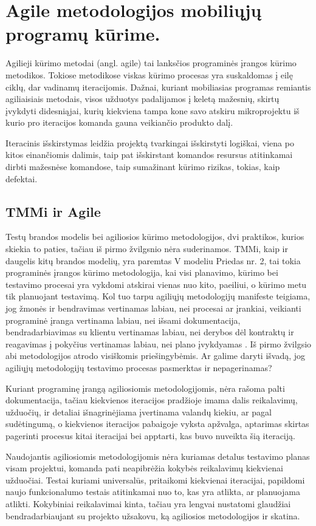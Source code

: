 \documentclass{VUMIFPSkursinis}
\begin{document}
\section{Agile metodologijos mobiliųjų programų kūrime.}
Agilieji kūrimo metodai (angl. agile) tai lanksčios programinės įrangos kūrimo metodikos. Tokiose metodikose viskas kūrimo procesas yra suskaldomas į eilę ciklų, dar vadinamų iteracijomis. Dažnai, kuriant mobiliasias programas remiantis agiliaisiais metodais, visos užduotys padalijamos į keletą mažesnių, skirtų įvykdyti didesniąjai, kurių kiekviena tampa kone savo atskiru mikroprojektu iš kurio pro iteracijos komanda gauna veikiančio produkto dalį.

Iteracinis išskirstymas leidžia projektą tvarkingai išskirstyti logiškai, viena po kitos einančiomis dalimis, taip pat išskirstant komandos resursus atitinkamai dirbti mažesnėse komandose, taip sumažinant kūrimo rizikas, tokias, kaip defektai.

\subsection{TMMi ir Agile}
Testų brandos modelis bei agiliosios kūrimo metodologijos, dvi praktikos, kurios skiekia to paties, tačiau iš pirmo žvilgsnio nėra suderinamos. TMMi, kaip ir daugelis kitų brandos modelių, yra paremtas V modeliu Priedas nr. 2, tai tokia programinės įrangos kūrimo metodologija, kai  visi planavimo, kūrimo bei testavimo procesai yra vykdomi atskirai vienas nuo kito, paeiliui, o kūrimo metu tik planuojant testavimą. Kol tuo tarpu agiliųjų metodologijų manifeste teigiama, jog žmonės ir bendravimas vertinamas labiau, nei procesai ar įrankiai, veikianti programinė įranga vertinama labiau, nei išsami dokumentacija, bendradarbiavimas su klientu vertinamas labiau, nei derybos dėl kontraktų ir reagavimas į pokyčius vertinamas labiau, nei plano įvykdyamas \cite{agile}. Iš pirmo žvilgsio abi metodologijos atrodo visiškomis priešingybėmis. Ar galime daryti išvadą, jog agiliųjų metodologijų testavimo procesas pasmerktas ir nepagerinamas?

Kuriant programinę įrangą agiliosiomis metodologijomis, nėra rašoma palti dokumentacija, tačiau kiekvienos iteracijos pradžioje imama dalis reikalavimų, užduočių, ir detaliai išnagrinėjiama įvertinama valandų kiekiu, ar pagal sudėtingumą, o kiekvienos iteracijos pabaigoje vyksta apžvalga, aptarimas skirtas pagerinti procesus kitai iteracijai bei apptarti, kas buvo nuveikta šią iteraciją.

Naudojantis agiliosiomis metodologijomis nėra kuriamas detalus testavimo planas visam projektui, komanda pati neapibrėžia kokybės reikalavimų kiekvienai užduočiai. Testai kuriami universalūs, pritaikomi kiekvienai iteracijai, papildomi naujo funkcionalumo testais atitinkamai nuo to, kas yra atlikta, ar planuojama atlikti. Kokybiniai reikalavimai kinta, tačiau yra lengvai nustatomi glaudžiai bendradarbiaujant su projekto užsakovu, ką agiliosios metodologijos ir skatina.
\end{document}
